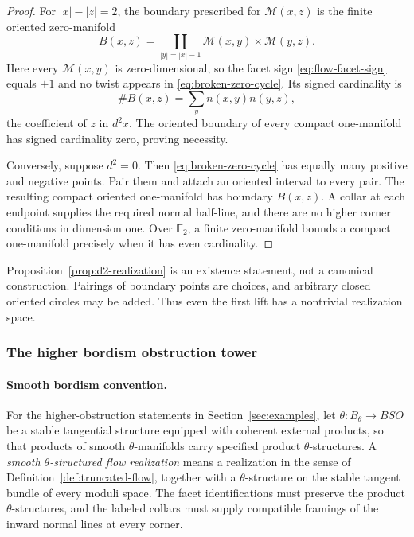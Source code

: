\documentclass[11pt,letterpaper,twoside]{article}
\theoremstyle{plain}
\theoremstyle{definition}
\theoremstyle{remark}
\begin{document}
\begin{proof}
For \(|x|-|z|=2\), the boundary prescribed for \(\mathcal M(x,z)\) is the finite oriented zero-manifold
\begin{equation}\label{eq:broken-zero-cycle}
 B(x,z)=\coprod_{|y|=|x|-1}
 \mathcal M(x,y)\times\mathcal M(y,z).
\end{equation}
Here every \(\mathcal M(x,y)\) is zero-dimensional, so the facet sign \eqref{eq:flow-facet-sign} equals \(+1\) and no twist appears in \eqref{eq:broken-zero-cycle}.  Its signed cardinality is
\[
 \#B(x,z)=\sum_y n(x,y)n(y,z),
\]
the coefficient of \(z\) in \(d^2x\).  The oriented boundary of every compact one-manifold has signed cardinality zero, proving necessity.

Conversely, suppose \(d^2=0\).  Then \eqref{eq:broken-zero-cycle} has equally many positive and negative points.  Pair them and attach an oriented interval to every pair.  The resulting compact oriented one-manifold has boundary \(B(x,z)\).  A collar at each endpoint supplies the required normal half-line, and there are no higher corner conditions in dimension one.  Over \(\mathbb F_2\), a finite zero-manifold bounds a compact one-manifold precisely when it has even cardinality.
\end{proof}

Proposition~\ref{prop:d2-realization} is an existence statement, not a canonical construction.  Pairings of boundary points are choices, and arbitrary closed oriented circles may be added.  Thus even the first lift has a nontrivial realization space.

\subsubsection{The higher bordism obstruction tower}

\paragraph{Smooth bordism convention.}
For the higher-obstruction statements in Section~\ref{sec:examples}, let
\(\theta:B_\theta\to BSO\) be a stable tangential structure equipped with coherent external products, so that products of smooth \(\theta\)-manifolds carry specified product \(\theta\)-structures.  A \emph{smooth \(\theta\)-structured flow realization} means a realization in the sense of Definition~\ref{def:truncated-flow}, together with a \(\theta\)-structure on the stable tangent bundle of every moduli space.  The facet identifications must preserve the product \(\theta\)-structures, and the labeled collars must supply compatible framings of the inward normal lines at every corner.
\end{document}
